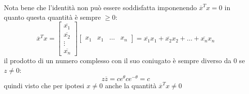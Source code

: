 Nota bene che l'identità non può essere soddisfatta imponenendo $ \overline{x}^{T}x =0$ in quanto questa quantità è sempre $ \ge 0 $:
\[
	\overline{x}^{T}x =
	\begin{bmatrix}
		\overline{x_1} \\
		\overline{x_2} \\
		\vdots         \\
		\overline{x_n}
	\end{bmatrix}
	\begin{bmatrix}
		x_1 & x_1 & \ldots & x_n
	\end{bmatrix}
	=
	\overline{x_1}x_1 + \overline{x_2}x_2 + \ldots + \overline{x_n}x_n
\]
il prodotto di un numero complesso con il suo coniugato è sempre diverso da 0 se $ z \neq 0 $:
\[
	z \overline{z} = c e^{\theta } c e^{-\theta } = c
\]
quindi visto che per ipotesi $ x \neq 0 $ anche la quantità $ \overline{x}^{T}x \neq 0$


